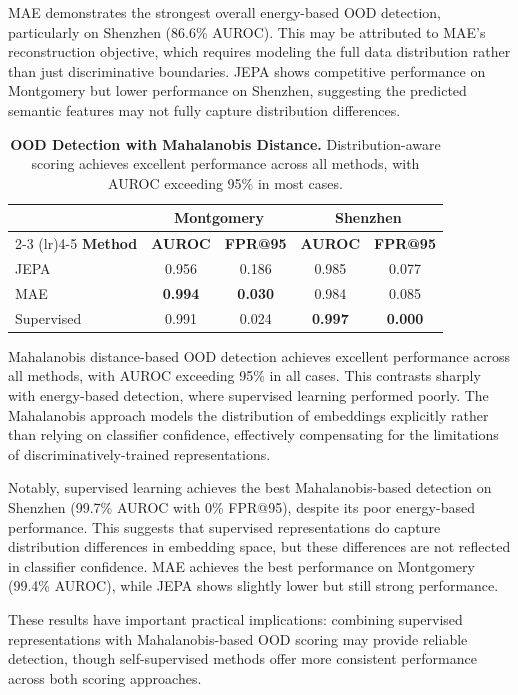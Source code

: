 \documentclass[11pt,a4paper]{article}
\begin{document}
MAE demonstrates the strongest overall energy-based OOD detection, particularly on Shenzhen (86.6\% AUROC). This may be attributed to MAE's reconstruction objective, which requires modeling the full data distribution rather than just discriminative boundaries. JEPA shows competitive performance on Montgomery but lower performance on Shenzhen, suggesting the predicted semantic features may not fully capture distribution differences.

\begin{table}[h]
\centering
\caption{\textbf{OOD Detection with Mahalanobis Distance.} Distribution-aware scoring achieves excellent performance across all methods, with AUROC exceeding 95\% in most cases.}
\label{tab:ood_mahal}
\begin{tabular}{@{}lcccc@{}}
\toprule
& \multicolumn{2}{c}{\textbf{Montgomery}} & \multicolumn{2}{c}{\textbf{Shenzhen}} \\
\cmidrule(lr){2-3} \cmidrule(lr){4-5}
\textbf{Method} & \textbf{AUROC} & \textbf{FPR@95} & \textbf{AUROC} & \textbf{FPR@95} \\
\midrule
JEPA & 0.956 & 0.186 & 0.985 & 0.077 \\
MAE & \textbf{0.994} & \textbf{0.030} & 0.984 & 0.085 \\
Supervised & 0.991 & 0.024 & \textbf{0.997} & \textbf{0.000} \\
\bottomrule
\end{tabular}
\end{table}

Mahalanobis distance-based OOD detection achieves excellent performance across all methods, with AUROC exceeding 95\% in all cases. This contrasts sharply with energy-based detection, where supervised learning performed poorly. The Mahalanobis approach models the distribution of embeddings explicitly rather than relying on classifier confidence, effectively compensating for the limitations of discriminatively-trained representations.

Notably, supervised learning achieves the best Mahalanobis-based detection on Shenzhen (99.7\% AUROC with 0\% FPR@95), despite its poor energy-based performance. This suggests that supervised representations do capture distribution differences in embedding space, but these differences are not reflected in classifier confidence. MAE achieves the best performance on Montgomery (99.4\% AUROC), while JEPA shows slightly lower but still strong performance.

These results have important practical implications: combining supervised representations with Mahalanobis-based OOD scoring may provide reliable detection, though self-supervised methods offer more consistent performance across both scoring approaches.
\end{document}
